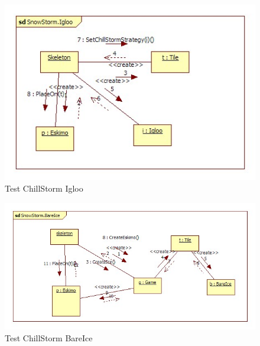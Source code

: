 \begin{figure}[H]
	\begin{center}
		\includegraphics[width=14cm]{chapters/chapter05/diagrams/Test_ChillStorm_Igloo_init.jpg}
		\caption{Test ChillStorm Igloo}
		\label{fig:Test ChillStorm Igloo}
	\end{center}
\end{figure}

\begin{figure}[H]
	\begin{center}
		\includegraphics[width=17cm]{chapters/chapter05/diagrams/Test_ChillStorm_BareIce_init.jpg}
		\caption{Test ChillStorm BareIce}
		\label{fig:Test ChillStorm BareIce}
	\end{center}
\end{figure}

